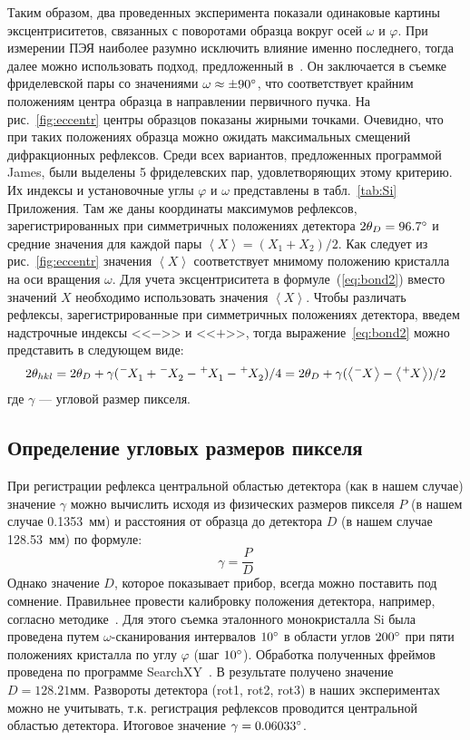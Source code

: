 Таким образом, два проведенных эксперимента показали одинаковые картины эксцентриситетов, связанных с поворотами образца вокруг осей $\omega$ и $\varphi$.
При измерении ПЭЯ наиболее разумно исключить влияние именно последнего, тогда далее можно использовать подход, предложенный в~\cite{Ponomarev:1969}.
Он заключается в съемке фриделевской пары со значениями $\omega \approx \pm 90^\circ$, что соответствует крайним положениям центра образца в направлении первичного пучка.
На рис.~\ref{fig:eccentr} центры образцов показаны жирными точками.
Очевидно, что при таких положениях образца можно ожидать максимальных смещений дифракционных рефлексов.
Среди всех вариантов, предложенных программой James, были выделены 5 фриделевских пар, удовлетворяющих этому критерию.
Их индексы и установочные углы $\varphi$ и $\omega$ представлены в табл.~\ref{tab:Si} Приложения.
Там же даны координаты максимумов рефлексов, зарегистрированных при симметричных положениях детектора $2\theta_D = 96.7^\circ$ и средние значения для каждой пары $\left<X\right> = (X_1 + X_2) / 2$.
Как следует из рис.~\ref{fig:eccentr} значения $\left<X\right>$ соответствует мнимому положению кристалла на оси вращения $\omega$.
Для учета эксцентриситета в формуле~(\ref{eq:bond2}) вместо значений $X$ необходимо использовать значения $\left<X\right>$.
Чтобы различать рефлексы, зарегистрированные при симметричных положениях детектора, введем надстрочные индексы <<$-$>> и <<$+$>>, тогда выражение~\ref{eq:bond2} можно представить в следующем виде:
\begin{equation}\label{eq:bond4}
    2\theta_{hkl} = 2\theta_D + \gamma (\tensor*[^-]{X}{_1} + \tensor*[^-]{X}{_2} - \tensor*[^+]{X}{_1} - \tensor*[^+]{X}{_2}) / 4 = 2\theta_D + \gamma (\left<\tensor*[^-]{X}{}\right> - \left<\tensor*[^+]{X}{}\right>) / 2
\end{equation}
где $\gamma$ --- угловой размер пикселя.

\subsection{Определение угловых размеров пикселя}

При регистрации рефлекса центральной областью детектора (как в нашем случае) значение $\gamma$ можно вычислить исходя из физических размеров пикселя $P$ (в нашем случае 0.1353~мм) и расстояния от образца до детектора $D$ (в нашем случае 128.53~мм) по формуле:
\begin{equation}\label{eq:pixsize}
    \gamma = \frac{P}{D}
\end{equation}
Однако значение $D$, которое показывает прибор, всегда можно поставить под сомнение.
Правильнее провести калибровку положения детектора, например, согласно методике~\cite{Panchenko:2023}.
Для этого съемка эталонного монокристалла Si была проведена путем $\omega$-сканирования интервалов $10^\circ$ в области углов $200^\circ$ при пяти положениях кристалла по углу $\varphi$ (шаг $10^\circ$).
Обработка полученных фреймов проведена по программе SearchXY~\cite{Panchenko:2023}.
В результате получено значение $D = 128.21\unit{мм}$.
Развороты детектора (rot1, rot2, rot3) в наших экспериментах можно не учитывать, т.к. регистрация рефлексов проводится центральной областью детектора.
Итоговое значение $\gamma = 0.06033^\circ$.

